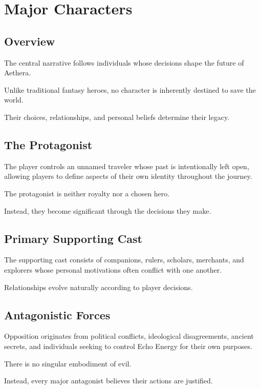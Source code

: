 \chapter{Major Characters}

\section{Overview}

The central narrative follows individuals whose decisions shape the future of Aethera.

Unlike traditional fantasy heroes, no character is inherently destined to save the world.

Their choices, relationships, and personal beliefs determine their legacy.

\section{The Protagonist}

The player controls an unnamed traveler whose past is intentionally left open, allowing players to define aspects of their own identity throughout the journey.

The protagonist is neither royalty nor a chosen hero.

Instead, they become significant through the decisions they make.

\section{Primary Supporting Cast}

The supporting cast consists of companions, rulers, scholars, merchants, and explorers whose personal motivations often conflict with one another.

Relationships evolve naturally according to player decisions.

\section{Antagonistic Forces}

Opposition originates from political conflicts, ideological disagreements, ancient secrets, and individuals seeking to control Echo Energy for their own purposes.

There is no singular embodiment of evil.

Instead, every major antagonist believes their actions are justified.